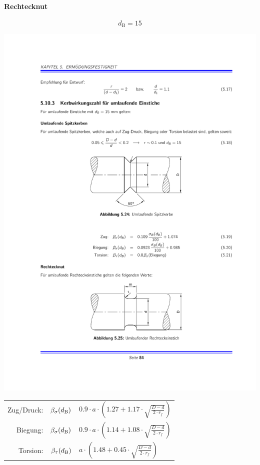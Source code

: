 		\paragraph{Rechtecknut}
		\begin{equation*}
			d_{\text{B}}= 15
		\end{equation*}
		\begin{center}
			\includegraphics[]{graphics/rechtecknut}
		\end{center}
		
		\begin{tabular}{rr@{$\:=\:$}l}
			Zug/Druck: & $\beta_\sigma (d_\text B)$ & $0.9 \cdot a \cdot \left( 1.27 + 1.17\cdot \sqrt{\frac{D-d}{2\cdot r_f}}\right)$ \\[2ex]
			Biegung: & $\beta_\sigma (d_\text B)$ & $0.9 \cdot a \cdot \left( 1.14 + 1.08\cdot \sqrt{\frac{D-d}{2\cdot r_f}}\right)$ \\[2ex]
			Torsion: & $\beta_\tau (d_\text B)$ & $a \cdot \left( 1.48 + 0.45\cdot \sqrt{\frac{D-d}{2\cdot r_f}}\right)$
		\end{tabular}
		
